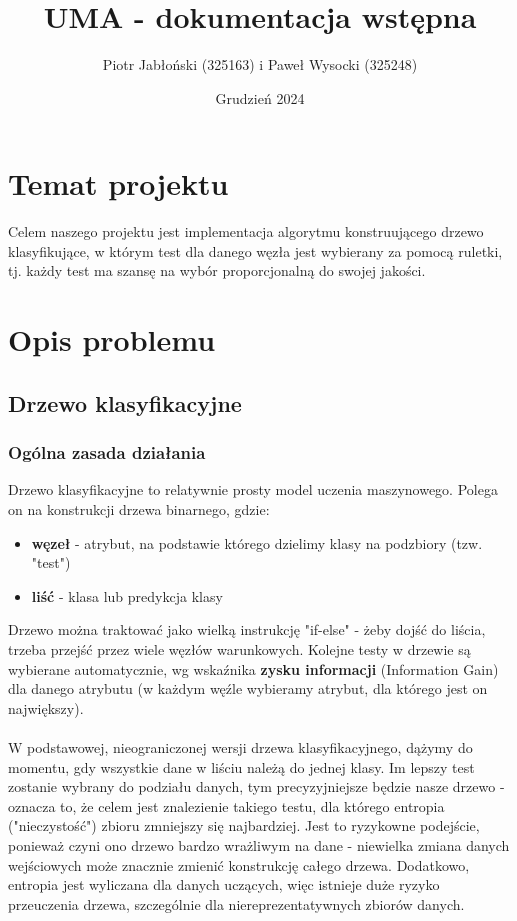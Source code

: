 \documentclass[11pt]{article}
\author{Piotr Jabłoński (325163) i Paweł Wysocki (325248)}
\date{Grudzień 2024}
\title{UMA - dokumentacja wstępna}
\begin{document}
\maketitle
\tableofcontents

\pagebreak
\section{Temat projektu}
\label{sec:org004bb5c}
Celem naszego projektu jest implementacja algorytmu konstruującego drzewo klasyfikujące, w którym test dla danego węzła jest wybierany za pomocą ruletki, tj. każdy test ma szansę na wybór proporcjonalną do swojej jakości.
\section{Opis problemu}
\label{sec:org19cc40d}

\subsection{Drzewo klasyfikacyjne}
\label{sec:orgdbf1c0f}

\subsubsection{Ogólna zasada działania}

Drzewo klasyfikacyjne to relatywnie prosty model uczenia maszynowego. Polega on na konstrukcji drzewa binarnego, gdzie:
\begin{itemize}
\item \textbf{węzeł} - atrybut, na podstawie którego dzielimy klasy na podzbiory (tzw. "test")
\item \textbf{liść} - klasa lub predykcja klasy
\end{itemize}
Drzewo można traktować jako wielką instrukcję "if-else" - żeby dojść do liścia, trzeba przejść przez wiele węzłów warunkowych. Kolejne testy w drzewie są wybierane automatycznie, wg wskaźnika \textbf{zysku informacji} (Information Gain) dla danego atrybutu (w każdym węźle wybieramy atrybut, dla którego jest on największy).\\\\
W podstawowej, nieograniczonej wersji drzewa klasyfikacyjnego, dążymy do momentu, gdy wszystkie dane w liściu należą do jednej klasy. Im lepszy test zostanie wybrany do podziału danych, tym precyzyjniejsze będzie nasze drzewo - oznacza to, że celem jest znalezienie takiego testu, dla którego entropia ("nieczystość") zbioru zmniejszy się najbardziej. Jest to ryzykowne podejście, ponieważ czyni ono drzewo bardzo wrażliwym na dane - niewielka zmiana danych wejściowych może znacznie zmienić konstrukcję całego drzewa. Dodatkowo, entropia jest wyliczana dla danych uczących, więc istnieje duże ryzyko przeuczenia drzewa, szczególnie dla niereprezentatywnych zbiorów danych.
\end{document}
